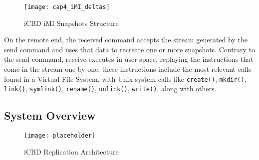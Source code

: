 \begin{figure}[htbp]
    \centering
    \texttt{[image: cap4\_iMI\_deltas]}
    \caption{iCBD iMI Snapshots Structure}
    \label{fig:imi_snap}
\end{figure}
\newpage

On the remote end, the received command accepts the stream generated by the send command and uses that data to recreate one or more snapshots. Contrary to the send command, receive executes in user space, replaying the instructions that come in the stream one by one, these instructions include the most relevant calls found in a Virtual File System, with Unix system calls like \texttt{create()}, \texttt{mkdir()}, \texttt{link()}, \texttt{symlink()}, \texttt{rename()}, \texttt{unlink()}, \texttt{write()}, along with others.~\cite{btrfs_design}





\subsection{System Overview}
\label{sub:system_overview}


\begin{figure}[htbp]
	\centering
	\texttt{[image: placeholder]}
	\caption{iCBD Replication Architecture}
	\label{fig:icbd_rep_architecture}
\end{figure}

